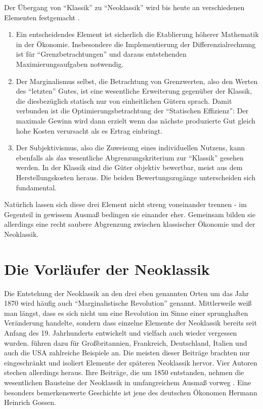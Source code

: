 Der Übergang von "`Klassik"' zu "`Neoklassik"' wird bis heute an verschiedenen Elementen festgemacht \parencite[S. 198]{Ekelund2002}.
\begin{enumerate}
	\item Ein entscheidendes Element ist sicherlich die Etablierung höherer Mathematik in der Ökonomie. Insbesondere die Implementierung der Differenzialrechnung ist für "`Grenzbetrachtungen"' und daraus entstehenden Maximierungsaufgaben notwendig.
	\item Der Marginalismus selbst, die Betrachtung von Grenzwerten, also den Werten des "`letzten"' Gutes, ist eine wesentliche Erweiterung gegenüber der Klassik, die diesbezüglich statisch nur von einheitlichen Gütern sprach. Damit verbunden ist die Optimierungsbetrachtung der "`Statischen Effizienz"': Der maximale Gewinn wird dann erzielt wenn das nächste produzierte Gut gleich hohe Kosten verursacht als es Ertrag einbringt. 
	\item Der Subjektivismus, also die Zuweisung eines individuellen Nutzens, kann ebenfalls als \textit{das} wesentliche Abgrenzungskriterium zur "`Klassik"' gesehen werden. In der Klassik sind die Güter objektiv bewertbar, meist aus dem Herstellungskosten heraus. Die beiden Bewertungszugänge unterscheiden sich fundamental.
\end{enumerate}

Natürlich lassen sich diese drei Element nicht streng voneinander trennen - im Gegenteil in gewissem Ausmaß bedingen sie einander eher. Gemeinsam bilden sie allerdings eine recht saubere Abgrenzung zwischen klassischer Ökonomie und der Neoklassik.

\section{Die Vorläufer der Neoklassik}
\label{Vorläufer}

Die Entstehung der Neoklassik an den drei eben genannten Orten um das Jahr 1870 wird häufig auch "`Marginalistische Revolution"' genannt. Mittlerweile weiß man längst, dass es sich nicht um eine Revolution im Sinne einer sprunghaften Veränderung handelte, sondern dass einzelne Elemente der Neoklassik bereits seit Anfang des 19. Jahrhunderts entwickelt und vielfach auch wieder vergessen wurden. \textcite{Ekelund2002} führen dazu für Großbritannien, Frankreich, Deutschland, Italien und auch die USA zahlreiche Beispiele an. Die meisten dieser Beiträge brachten nur eingeschränkt und isoliert Elemente der späteren Neoklassik hervor. Vier Autoren stechen allerdings heraus. Ihre Beiträge, die um 1850 entstanden, nehmen die wesentlichen Bausteine der Neoklassik in umfangreichem Ausmaß vorweg \parencite[S. 205]{Ekelund2002}. Eine besonders bemerkenswerte Geschichte ist jene des deutschen Ökonomen Hermann Heinrich Gossen.

